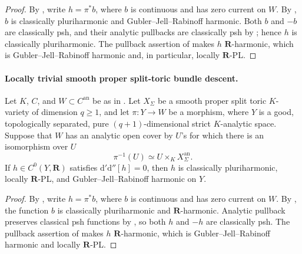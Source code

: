 \begin{proof}
By , write \(h=\pi^*b\), where
\(b\) is continuous and has zero current on \(W\).  By
, \(b\) is classically
pluriharmonic and Gubler--Jell--Rabinoff harmonic.  Both \(b\) and \(-b\)
are classically psh, and their analytic pullbacks are classically psh by
\cite[Proposition~4.2(6)]{GR25Classical}; hence \(h\) is classically
pluriharmonic.  The pullback assertion of
 makes \(h\) \(\mathbf R\)-harmonic,
which is Gubler--Jell--Rabinoff harmonic and, in particular, locally
\(\mathbf R\)-PL.
\end{proof}

\paragraph{Locally trivial smooth proper split-toric bundle descent.}



\begin{corollary}
\label{cor:p062-smooth-proper-split-toric-bundles-over-curves}
Let \(K\), \(C\), and \(W\subset C^{\mathrm{an}}\) be as in
.  Let \(X_\Sigma\) be a smooth proper
split toric \(K\)-variety of dimension \(q\geq1\), and let
\(\pi:Y\to W\) be a morphism, where \(Y\) is a good, topologically
separated, pure \((q+1)\)-dimensional strict \(K\)-analytic space.  Suppose
that \(W\) has an analytic open cover by \(U\)'s for which there is an
isomorphism over \(U\)
\[
                 \pi^{-1}(U)\simeq U\times_KX_\Sigma^{\mathrm{an}}.
\]
If \(h\in C^0(Y,\mathbf R)\) satisfies
\(\mathrm d'\mathrm d''[h]=0\), then \(h\) is classically
pluriharmonic, locally \(\mathbf R\)-PL, and Gubler--Jell--Rabinoff
harmonic on \(Y\).
\end{corollary}

\begin{proof}
By , write
\(h=\pi^*b\), where \(b\) is continuous and has zero current on \(W\).
By , the function \(b\) is
classically pluriharmonic and \(\mathbf R\)-harmonic.  Analytic pullback
preserves classical psh functions by
\cite[Proposition~4.2(6)]{GR25Classical}, so both \(h\) and \(-h\) are
classically psh.  The pullback assertion of
 makes \(h\) \(\mathbf R\)-harmonic,
which is Gubler--Jell--Rabinoff harmonic and locally \(\mathbf R\)-PL.
\end{proof}

